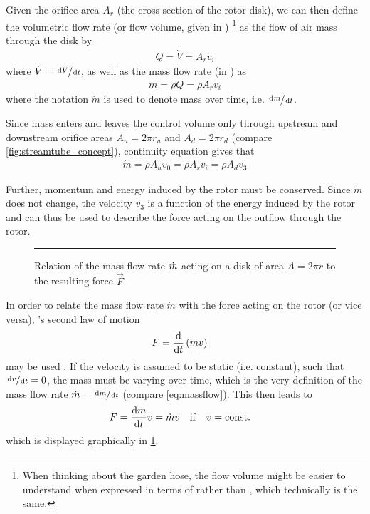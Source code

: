 Given the orifice area $A_r$ (the cross-section of the rotor disk), we can then define the volumetric flow rate %
(or flow volume, given in \withunit{\cubic\metre\per\second})%
\footnote{When
thinking about the garden hose, the flow volume might be easier to understand when expressed in terms of  rather than , which technically is the same.}
as the flow of air mass through the disk by
%
\begin{align}
Q = \dot{V} = A_r v_i \label{eq:flowvolume}
\end{align}
%
where $\dot{V} = \sfrac{\mathop{}\!\mathrm{d} V}{\mathop{}\!\mathrm{d} t}$, as well as the mass flow rate (in \withunit{\kilo\gram\per\second}) as
%
\begin{align}
\dot{m} = \rho Q = \rho A_r v_i \label{eq:massflow}
\end{align}
%
where the notation $\dot{m}$ is used to denote mass over time, i.e. $\sfrac{\mathop{}\!\mathrm{d} m}{\mathop{}\!\mathrm{d} t}$. %

Since mass enters and leaves the control volume only through upstream and downstream orifice areas $A_u = 2 \pi r_u$ and $A_d = 2 \pi r_d$ (compare \cref{fig:streamtube_concept}), continuity equation gives that 
%
\begin{align}
\dot{m} = \rho A_u v_0 = \rho A_r v_i = \rho A_d v_3 \label{eq:massflow_continuity}
\end{align}

Further, momentum and energy induced by the rotor must be conserved. 
Since $\dot{m}$ does not change, the velocity $v_3$ is a function of the energy induced by the rotor and can thus be used to describe the force acting on the outflow through the rotor.

\begin{figure}
	\centering
	

	\rule{35em}{0.5pt}
	\caption[Mass flow rate and force]
			{Relation of the mass flow rate $\dot{m}$ acting on a disk of area $A = 2\pi r$ to the resulting force $\vec{F}$.}
	\label{fig:mass_flow_force}
\end{figure}

In order to relate the mass flow rate $\dot{m}$ with the force acting on the rotor (or vice versa), 's second law of motion
%
\begin{align}
F &= \frac{\mathop{}\!\mathrm{d}}{\mathop{}\!\mathrm{d} t} \left( m v \right) \label{eq:newtons_2nd}
\end{align}
%
may be used \cite{book:siekmann2008}.
If the velocity is assumed to be static (i.e. constant), such that $\sfrac{\mathop{}\!\mathrm{d} v}{\mathop{}\!\mathrm{d} t} = 0$, the mass must be varying over time, which is the very definition of the mass flow rate $\dot{m} = \sfrac{\mathop{}\!\mathrm{d} m}{\mathop{}\!\mathrm{d} t}$ (compare \cref{eq:massflow}). 
This then leads to
%
\begin{align}
F &= \frac{\mathop{}\!\mathrm{d} m}{\mathop{}\!\mathrm{d} t} v = \dot{m} v \quad \mathrm{if} \quad v = \mathrm{const.} \label{eq:newtons_2nd_mdot}
\end{align}
%
which is displayed graphically in \cref{fig:mass_flow_force}.


